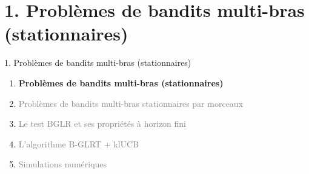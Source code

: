 \documentclass[11pt,french,ignorenonframetext,]{beamer}
\begin{document}






\section{\hfill{}1. Problèmes de bandits multi-bras (stationnaires)\hfill{}}

\begin{frame}{1. Problèmes de bandits multi-bras (stationnaires)}

  \begin{enumerate}
    \item
    \alert{\textbf{%
      Problèmes de bandits multi-bras (stationnaires)
    }}
    \vspace*{15pt}

    \item
    \textcolor{gray}{
      Problèmes de bandits multi-bras stationnaires par morceaux
    }
    \vspace*{15pt}

    \item
    \textcolor{gray}{
      Le test BGLR et ses propriétés à horizon fini
    }
    \vspace*{15pt}

    \item
    \textcolor{gray}{
      L'algorithme B-GLRT + klUCB
    }
    \vspace*{15pt}


    \item
    \textcolor{gray}{
      Simulations numériques
    }
  \end{enumerate}

\end{frame}
\end{document}
